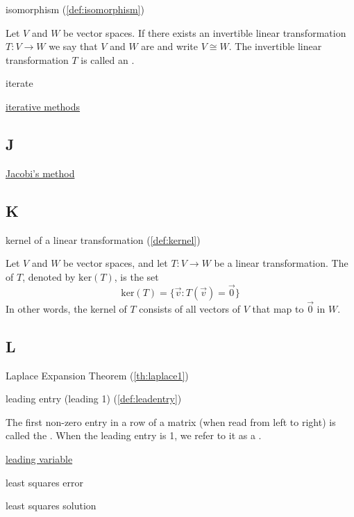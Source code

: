 \documentclass{ximera}
\begin{document}
isomorphism (\ref{def:isomorphism})
\begin{expandable}
    Let $V$ and $W$ be vector spaces.  If there exists an invertible linear transformation $T:V\rightarrow W$ we say that $V$ and $W$ are  and write $V\cong W$.  The invertible linear transformation $T$ is called an .
\end{expandable}

iterate

\href{https://ximera.osu.edu/oerlinalg/LinearAlgebra/SYS-0040/main}{iterative methods}

\subsection{J}

\href{https://ximera.osu.edu/oerlinalg/LinearAlgebra/SYS-0040/main}{Jacobi's method}


\subsection{K}

kernel of a linear transformation (\ref{def:kernel})
\begin{expandable}
    Let $V$ and $W$ be vector spaces, and let $T:V\rightarrow W$ be a linear transformation.  The  of $T$, denoted by $\mbox{ker}(T)$, is the set
$$\mbox{ker}(T)=\{\vec{v}:T(\vec{v})=\vec{0}\}$$
In other words, the kernel of $T$ consists of all vectors of $V$ that map to $\vec{0}$ in $W$.
\end{expandable}

\subsection{L}

Laplace Expansion Theorem (\ref{th:laplace1})

leading entry (leading 1) (\ref{def:leadentry})
\begin{expandable}
    The first non-zero entry in a row of a matrix (when read from left to right) is called the .  When the leading entry is 1, we refer to it as a .
\end{expandable}

\href{https://ximera.osu.edu/oerlinalg/LinearAlgebra/SYS-0020/main}{leading variable}

least squares error %

least squares solution %
\end{document}
